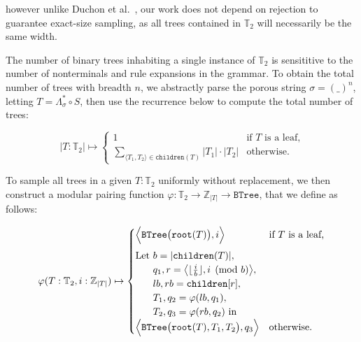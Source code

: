 \documentclass[sigplan,review,anonymous,acmsmall]{acmart}\settopmatter{printfolios=false,printccs=false,printacmref=false}
\begin{document}
\noindent however unlike Duchon et al.~\cite{duchon2004boltzmann}, our work does not depend on rejection to guarantee exact-size sampling, as all trees contained in $\mathbb{T}_2$ will necessarily be the same width.


The number of binary trees inhabiting a single instance of $\mathbb{T}_2$ is sensititive to the number of nonterminals and rule expansions in the grammar. To obtain the total number of trees with breadth $n$, we abstractly parse the porous string $\sigma = (\_)^n$, letting $T=\Lambda_{\sigma}^* \circ S$, then use the recurrence below to compute the total number of trees:

\begin{equation}
  |T: \mathbb{T}_2| \mapsto \begin{cases}
    1 & \text{if $T$ is a leaf,} \\
    \sum_{\langle T_1, T_2\rangle \in \texttt{children}(T)} |T_1| \cdot |T_2| & \text{otherwise.}
  \end{cases}
\end{equation}

To sample all trees in a given $T: \mathbb{T}_2$ uniformly without replacement, we then construct a modular pairing function $\varphi: \mathbb{T}_2 \rightarrow \mathbb{Z}_{|T|} \rightarrow \texttt{BTree}$, that we define as follows:

\begin{equation}
  \varphi(T: \mathbb{T}_2, i: \mathbb{Z}_{|T|}) \mapsto \begin{cases}
  \Big\langle\texttt{BTree}\big(\texttt{root}(T)\big), i\Big\rangle & \text{if $T$ is a leaf,} \vspace{5pt}\\
  \text{Let } b = |\texttt{children}(T)|,\\
  \phantom{\text{Let }} q_1, r=\big\langle\lfloor\frac{i}{b}\rfloor, i \pmod{b}\big\rangle,\\
  \phantom{\text{Let }} lb, rb = \texttt{children}[r],\\
  \phantom{\text{Let }} T_1, q_2 = \varphi(lb, q_1),\\
  \phantom{\text{Let }} T_2, q_3 = \varphi(rb, q_2) \text{ in } \\
  \Big\langle\texttt{BTree}\big(\texttt{root}(T), T_1, T_2\big), q_3\Big\rangle & \text{otherwise.} \\
  \end{cases}
\end{equation}
\end{document}
